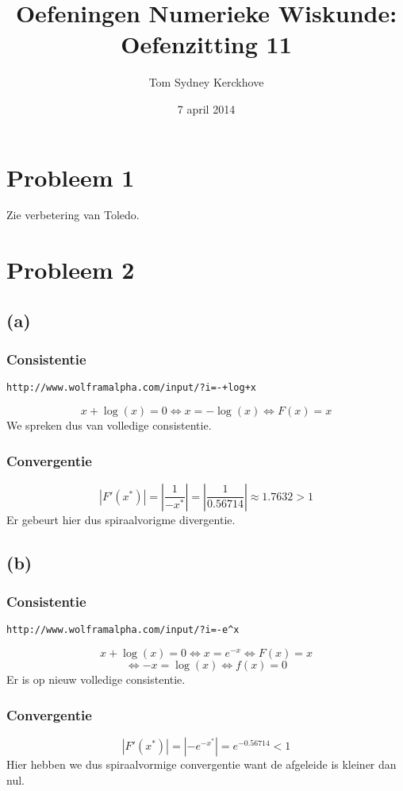 \documentclass[12pt,a4paper]{article}
\author{Tom Sydney Kerckhove}
\title{Oefeningen Numerieke Wiskunde:\\ Oefenzitting 11}
\date{7 april 2014}
\begin{document}
\maketitle

\section{Probleem 1}
Zie verbetering van Toledo.
\section{Probleem 2}
\subsection*{(a)}
\subsubsection*{Consistentie}
\begin{verbatim}
http://www.wolframalpha.com/input/?i=-+log+x
\end{verbatim}
\[
x + \log(x) = 0 \Leftrightarrow x = -\log(x)
\Leftrightarrow F(x) = x
\]
We spreken dus van volledige consistentie.
\subsubsection*{Convergentie}
$$|F'(x^*)| = |\frac{1}{-x^*}| = |\frac{1}{0.56714}| \approx 1.7632 > 1$$
Er gebeurt hier dus spiraalvorigme divergentie.

\subsection*{(b)}
\subsubsection*{Consistentie}
\begin{verbatim}
http://www.wolframalpha.com/input/?i=-e^x
\end{verbatim}
\[
x + \log(x) = 0 \Leftrightarrow x = e^{-x} 
\Leftrightarrow F(x) = x
\]
$$\Leftrightarrow -x = \log(x) \Leftrightarrow f(x) = 0$$
Er is op nieuw volledige consistentie.
\subsubsection*{Convergentie}
$$|F'(x^*)| = |-e^{-x^*}| = e^{-0.56714} < 1$$
Hier hebben we dus spiraalvormige convergentie want de afgeleide is kleiner dan nul.
\end{document}
